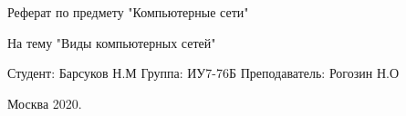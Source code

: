 \begin{center}
	Реферат по предмету "Компьютерные сети"
	
	На тему "Виды компьютерных сетей"
\end{center}


\begin{flushright}
Студент: Барсуков Н.М \newline
Группа: ИУ7-76Б \newline
Преподаватель: Рогозин Н.О \newline
\end{flushright}

\vspace{\fill}
\begin{center}
	Москва 2020.
\end{center}
